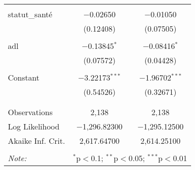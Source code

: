 \documentclass[
  14pt,
  french,
]{article}
\begin{document}
\begin{table}[!htbp]
\begin{tabular}{@{\extracolsep{5pt}}lcc}
  & & \\ 
 statut\_santé & $-$0.02650 & $-$0.01050 \\ 
  & (0.12408) & (0.07505) \\ 
  & & \\ 
 adl & $-$0.13845$^{*}$ & $-$0.08416$^{*}$ \\ 
  & (0.07572) & (0.04428) \\ 
  & & \\ 
 Constant & $-$3.22173$^{***}$ & $-$1.96702$^{***}$ \\ 
  & (0.54526) & (0.32671) \\ 
  & & \\ 
\hline \\[-1.8ex] 
Observations & 2,138 & 2,138 \\ 
Log Likelihood & $-$1,296.82300 & $-$1,295.12500 \\ 
Akaike Inf. Crit. & 2,617.64700 & 2,614.25100 \\ 
\hline 
\hline \\[-1.8ex] 
\textit{Note:}  & \multicolumn{2}{r}{$^{*}$p$<$0.1; $^{**}$p$<$0.05; $^{***}$p$<$0.01} \\ 
\end{tabular} 
\end{table}
\end{document}
